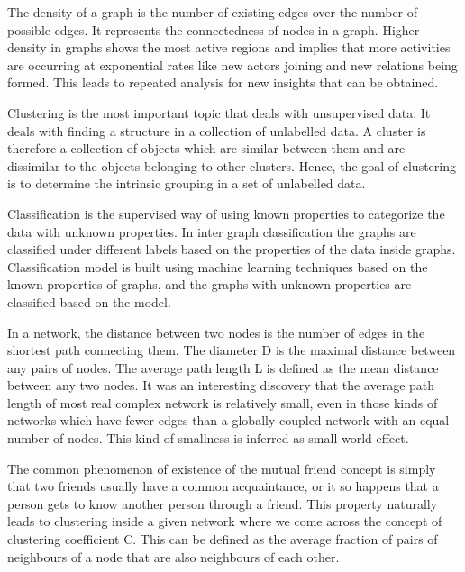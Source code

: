 
The density of a graph is the number of existing edges over the number of possible edges. It represents the connectedness of nodes in a graph. Higher density in graphs shows the most active regions and implies that more activities are occurring at exponential rates like new actors joining and new relations being formed. This leads to repeated analysis for new insights that can be obtained.



Clustering is the most important topic that deals with unsupervised data. It deals with finding a structure in a collection of unlabelled data. A cluster is therefore a collection of objects which are similar between them and are dissimilar to the objects belonging to other clusters. Hence, the goal of clustering is to determine the intrinsic grouping in a set of unlabelled data.

\pagebreak
{}

Classification is the supervised way of using known properties to categorize the data with unknown properties. In inter graph classification the graphs are classified under different labels based on the properties of the data inside graphs. Classification model is built using machine learning techniques based on the known properties of graphs, and the graphs with unknown properties are classified based on the model.


In a network, the distance between two nodes is the number of edges in the shortest path connecting them. The diameter D is the maximal distance between any pairs of nodes. The average path length L is defined as the mean distance between any two nodes. It was an interesting discovery that the average path length of most real complex network is relatively small, even in those kinds of networks which have fewer edges than a globally coupled network with an equal number of nodes. This kind of smallness is inferred as small world effect. 


The common phenomenon of existence of the mutual friend concept is simply that two friends usually have a common acquaintance, or it so happens that a person gets to know another person through a friend. This property naturally leads to clustering inside a given network where we come across the concept of clustering coefficient C. This can be defined as the average fraction of pairs of neighbours of a node that are also neighbours of each other. 

